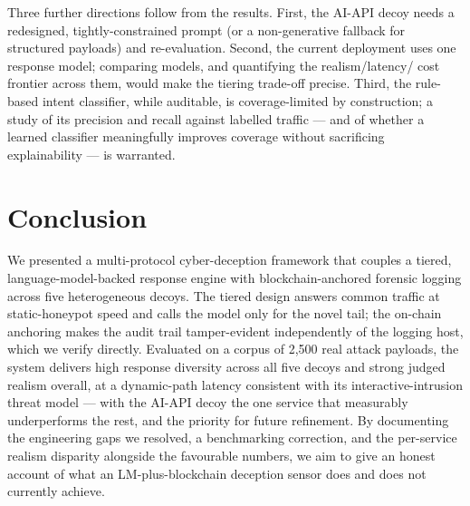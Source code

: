 \documentclass[conference]{IEEEtran}
\begin{document}
Three further directions follow from the results. First, the AI-API decoy needs a redesigned, tightly-constrained prompt (or a non-generative fallback for structured payloads) and re-evaluation. Second, the current deployment uses one response model; comparing models, and quantifying the realism/latency/ cost frontier across them, would make the tiering trade-off precise. Third, the rule-based intent classifier, while auditable, is coverage-limited by construction; a study of its precision and recall against labelled traffic --- and of whether a learned classifier meaningfully improves coverage without sacrificing explainability --- is warranted.

\section{Conclusion}

We presented a multi-protocol cyber-deception framework that couples a tiered, language-model-backed response engine with blockchain-anchored forensic logging across five heterogeneous decoys. The tiered design answers common traffic at static-honeypot speed and calls the model only for the novel tail; the on-chain anchoring makes the audit trail tamper-evident independently of the logging host, which we verify directly. Evaluated on a corpus of 2,500 real attack payloads, the system delivers high response diversity across all five decoys and strong judged realism overall, at a dynamic-path latency consistent with its interactive-intrusion threat model --- with the AI-API decoy the one service that measurably underperforms the rest, and the priority for future refinement. By documenting the engineering gaps we resolved, a benchmarking correction, and the per-service realism disparity alongside the favourable numbers, we aim to give an honest account of what an LM-plus-blockchain deception sensor does and does not currently achieve.

\end{document}
